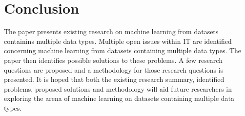 \chapter{Conclusion}

The paper presents existing research on machine learning from datasets containins multiple data types.  Multiple open issues within IT are identified concerning machine learning from datasets containing multiple data types.  The paper then identifies possible solutions to these problems.  A few research questions are proposed and a methodology for those research questions is presented.  It is hoped that both the existing research summary, identified problems, proposed solutions and methodology will aid future researchers in exploring the arena of machine learning on datasets containing multiple data types.  

